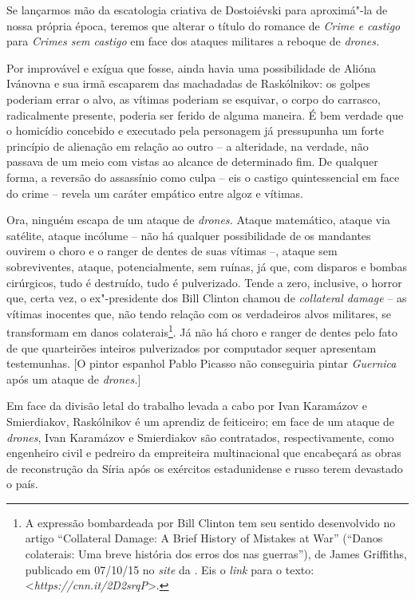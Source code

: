 Se lançarmos mão da escatologia criativa de Dostoiévski para aproximá"-la
de nossa própria época, teremos que alterar o título do romance de
\emph{Crime e castigo} para \emph{Crimes sem castigo} em face dos
ataques militares a reboque de \emph{drones. }

Por improvável e exígua que fosse, ainda havia uma possibilidade de
Alióna Ivánovna e sua irmã escaparem das machadadas de Raskólnikov: os
golpes poderiam errar o alvo, as vítimas poderiam se esquivar, o corpo
do carrasco, radicalmente presente, poderia ser ferido de alguma
maneira. É bem verdade que o homicídio concebido e executado pela
personagem já pressupunha um forte princípio de alienação em relação ao
outro -- a alteridade, na verdade, não passava de um meio com vistas ao
alcance de determinado fim. De qualquer forma, a reversão do assassínio
como culpa -- eis o castigo quintessencial em face do crime -- revela um
caráter empático entre algoz e vítimas.

Ora, ninguém escapa de um ataque de \emph{drones.} Ataque matemático,
ataque via satélite, ataque incólume -- não há qualquer possibilidade de
os mandantes ouvirem o choro e o ranger de dentes de suas vítimas --,
ataque sem sobreviventes, ataque, potencialmente, sem ruínas, já que,
com disparos e bombas cirúrgicos, tudo é destruído, tudo é pulverizado.
Tende a zero, inclusive, o horror que, certa vez, o ex"-presidente dos
 Bill Clinton chamou de \emph{collateral damage} -- as vítimas
inocentes que, não tendo relação com os verdadeiros alvos militares, se
transformam em danos colaterais\footnote{A expressão bombardeada por
  Bill Clinton tem seu sentido desenvolvido no artigo ``Collateral
  Damage: A Brief History of  Mistakes at War'' (``Danos colaterais:
  Uma breve história dos erros dos  nas guerras''), de James
  Griffiths, publicado em 07/10/15 no \emph{site} da \emph{}. Eis o
  \emph{link} para o texto: \textless{}\emph{https://cnn.it/2D2srqP}\textgreater{}.}.
Já não há choro e ranger de dentes pelo fato de que quarteirões inteiros
pulverizados por computador sequer apresentam testemunhas. {[}O pintor
espanhol Pablo Picasso não conseguiria pintar \emph{Guernica} após um
ataque de \emph{drones.}{]}

Em face da divisão letal do trabalho levada a cabo por Ivan Karamázov e
Smierdiakov, Raskólnikov é um aprendiz de feiticeiro; em face de um
ataque de \emph{drones}, Ivan Karamázov e Smierdiakov são contratados,
respectivamente, como engenheiro civil e pedreiro da empreiteira
multinacional que encabeçará as obras de reconstrução da Síria após os
exércitos estadunidense e russo terem devastado o país.

